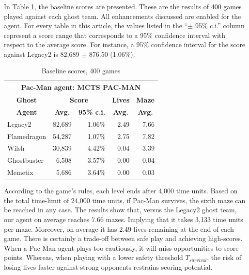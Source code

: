 \documentclass[journal]{IEEEtran}
\begin{document}
In Table \ref{tab:base_scores}, the baseline scores are presented. These are the results of 400 games played against each ghost team. All enhancements discussed are enabled for the agent. For every table in this article, the values listed in the ``$\pm$ 95\% c.i.'' column represent a score range that corresponds to a 95\% confidence interval with respect to the average score. For instance, a 95\% confidence interval for the score against {\sc Legacy2} is 82,689 $\pm$ 876.50 (1.06\%). 

\begin{table}[htbp]
  \centering
  \caption{Baseline scores, 400 games}
    \begin{tabular}{lrrrr}
    \toprule
    \multicolumn{5}{c}{\textbf{Pac-Man agent: MCTS PAC-MAN}} \\
    \midrule
    \multicolumn{1}{c}{\textbf{Ghost}} & \multicolumn{2}{c}{\textbf{Score}} & \multicolumn{1}{c}{\textbf{Lives}} & \multicolumn{1}{c}{\textbf{Maze}} \\
    \multicolumn{1}{c}{\textbf{Agent}} & \multicolumn{1}{c}{\textbf{Avg.}} & \multicolumn{1}{c}{\textbf{95\% c.i.}} & \multicolumn{1}{c}{\textbf{Avg.}} & \multicolumn{1}{c}{\textbf{Avg.}} \\ \noalign{\smallskip}
    {\sc Legacy2 } & 82,689 & 1.06\% & 2.49  & 7.66 \\
    {\sc Flamedragon } & 54,287 & 1.07\% & 2.75  & 7.82 \\
    {\sc Wilsh } & 30,839 & 4.42\% & 0.04  & 3.39 \\
    {\sc Ghostbuster } & 6,508 & 3.57\% & 0.00  & 0.04 \\
    {\sc Memetix } & 5,686 & 3.64\% & 0.00  & 0.03 \\
    \bottomrule
    \end{tabular}%
  \label{tab:base_scores}%
\end{table}%

According to the game's rules, each level ends after 4,000 time units. Based on the total time-limit of 24,000 time units, if Pac-Man survives, the sixth maze can be reached in any case. The results show that, versus the {\sc Legacy2} ghost team, our agent on average reaches $7.66$ mazes. Implying that it takes 3,133 time units per maze. Moreover, on average it has 2.49 lives remaining at the end of each game. There is certainly a trade-off between safe play and achieving high-scores. When a Pac-Man agent plays too cautiously, it will miss opportunities to score points. Whereas, when playing with a lower safety threshold $T_{survival}$, the risk of losing lives faster against strong opponents restrains scoring potential.
\end{document}
